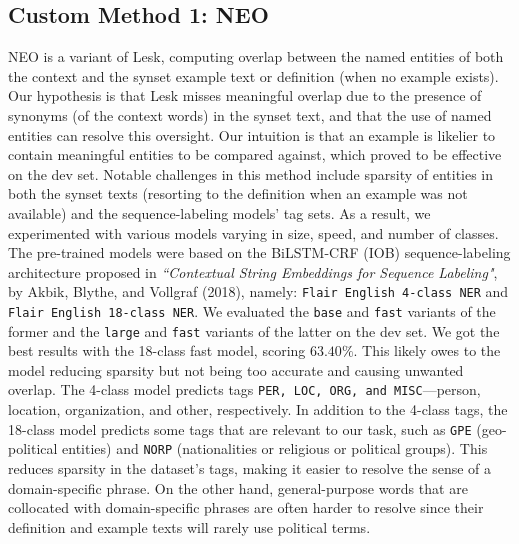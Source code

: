 \documentclass[11pt]{article}
\begin{document}
\vspace{-2ex}
\subsection{Custom Method 1: NEO}
\vspace{-1ex}
NEO is a variant of Lesk, computing overlap between the named entities of 
both the context and the synset example text or definition (when no example exists). 
Our hypothesis is that Lesk misses meaningful overlap due to the presence of 
synonyms (of the context words) in the synset text, and that the use of named entities can resolve this oversight.
Our intuition is that an example is likelier to contain meaningful entities to be compared against,
which proved to be effective on the dev set. Notable challenges in 
this method include sparsity of entities in both the synset texts 
(resorting to the definition when an example was not available) and the sequence-labeling models' tag sets. 
As a result, we experimented with various models varying in size, speed, and number of classes. 
The pre-trained models were based on the BiLSTM-CRF (IOB) sequence-labeling architecture proposed in 
\textit{``Contextual String Embeddings for Sequence Labeling"}, 
by Akbik, Blythe, and Vollgraf (2018), namely: \texttt{Flair English 4-class NER} and \texttt{Flair English 18-class NER}.
We evaluated the \texttt{base} and \texttt{fast} variants of the former and the \texttt{large} 
and \texttt{fast} variants of the latter on the dev set. We got the  
best results with the 18-class fast model, scoring $63.40\%$. This likely owes to the model
reducing sparsity but not being too accurate and causing unwanted overlap. The 4-class model predicts tags \texttt{PER, LOC, ORG, and MISC}---person, location, organization, and other, respectively. 
In addition to the 4-class tags, the 18-class model predicts some tags that are relevant to our task, such as \texttt{GPE} (geo-political entities) and \texttt{NORP} (nationalities or 
religious or political groups). This reduces sparsity in the dataset's tags, making it easier to resolve the sense of a domain-specific phrase. On the other hand,
general-purpose words that are collocated with domain-specific phrases are often harder to resolve since
their definition and example texts will rarely use political terms.

\vspace{-2ex}
\end{document}
